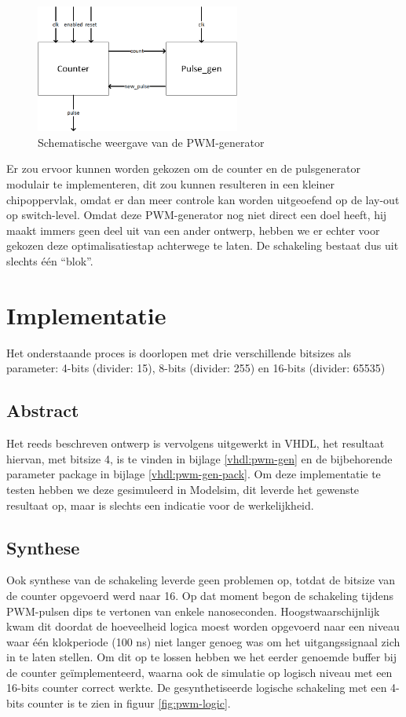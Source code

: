 \documentclass{article}
\begin{document}
\begin{figure}[H]
	\centering
	\includegraphics[width=0.6\textwidth]{resource/pwm_gen.png}
	\caption{Schematische weergave van de PWM-generator}
	\label{fig:pwm-schem}
\end{figure}

Er zou ervoor kunnen worden gekozen om de counter en de pulsgenerator modulair te implementeren, dit zou kunnen resulteren in een kleiner chipoppervlak, omdat er dan meer controle kan worden uitgeoefend op de lay-out op switch-level. Omdat deze PWM-generator nog niet direct een doel heeft, hij maakt immers geen deel uit van een ander ontwerp, hebben we er echter voor gekozen deze optimalisatiestap achterwege te laten. 
De schakeling bestaat dus uit slechts één ``blok''.

\section{Implementatie}
\label{sec:pwm-impl}
\footnotesize
Het onderstaande proces is doorlopen met drie verschillende bitsizes als parameter: 4-bits (divider: 15), 8-bits (divider: 255) en 16-bits (divider: 65535)

\normalsize
\subsection{Abstract}
\label{ssec:pwm-impl-abstr}
Het reeds beschreven ontwerp is vervolgens uitgewerkt in VHDL, het resultaat hiervan, met bitsize 4, is te vinden in bijlage \ref{vhdl:pwm-gen} en de bijbehorende parameter package in bijlage \ref{vhdl:pwm-gen-pack}. Om deze implementatie te testen hebben we deze gesimuleerd in Modelsim, dit leverde het gewenste resultaat op, maar is slechts een indicatie voor de werkelijkheid.

\subsection{Synthese}
\label{ssec:pwm-impl-synth}
Ook synthese van de schakeling leverde geen problemen op, totdat de bitsize van de counter opgevoerd werd naar 16. Op dat moment begon de schakeling tijdens PWM-pulsen dips te vertonen van enkele nanoseconden. Hoogstwaarschijnlijk kwam dit doordat de hoeveelheid logica moest worden opgevoerd naar een niveau waar één klokperiode (100 ns) niet langer genoeg was om het uitgangssignaal zich in te laten stellen. Om dit op te lossen hebben we het eerder genoemde buffer bij de counter geïmplementeerd, waarna ook de simulatie op logisch niveau met een 16-bits counter correct werkte.
De gesynthetiseerde logische schakeling met een 4-bits counter is te zien in figuur \ref{fig:pwm-logic}.
\end{document}
